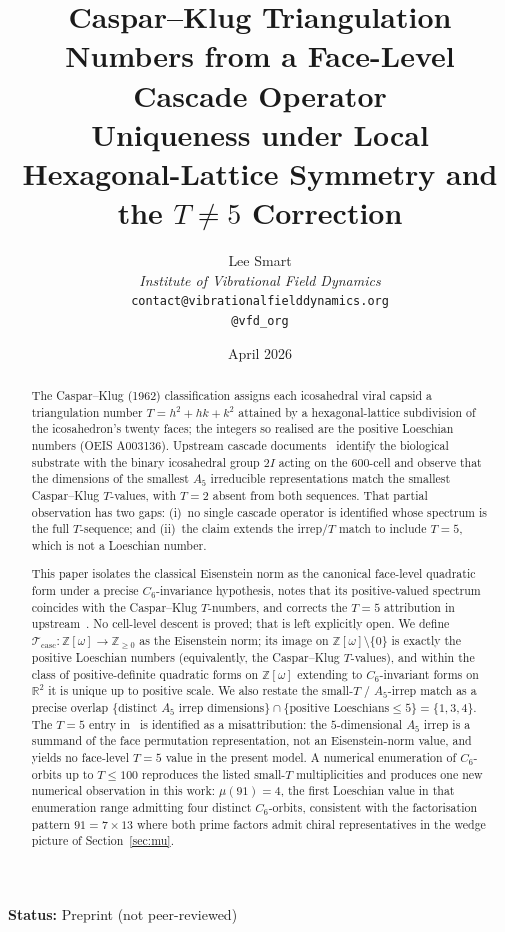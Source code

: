 \documentclass[12pt]{article}
\title{Caspar--Klug Triangulation Numbers from a Face-Level Cascade Operator\\[6pt]
\large Uniqueness under Local Hexagonal-Lattice Symmetry and the $T\neq5$ Correction}
\author{%
  Lee Smart\\[4pt]
  \textit{Institute of Vibrational Field Dynamics}\\[2pt]
  \texttt{contact@vibrationalfielddynamics.org}\\[2pt]
  \texttt{@vfd\_org}%
}
\date{April 2026}
\newcommand{\Tcasc}{\mathcal{T}_{\mathrm{casc}}}
\newcommand{\Zom}{\mathbb{Z}[\omega]}
\begin{document}
\maketitle

\noindent\textbf{Status:} Preprint (not peer-reviewed)

\begin{abstract}
The Caspar--Klug (1962) classification assigns each icosahedral viral
capsid a triangulation number $T = h^2 + hk + k^2$ attained by a
hexagonal-lattice subdivision of the icosahedron's twenty faces; the
integers so realised are the positive Loeschian numbers (OEIS
A003136).
Upstream cascade documents~\cite{CascadeBio} identify the biological
substrate with the binary icosahedral group $2I$ acting on the 600-cell
and observe that the dimensions of the smallest $A_5$ irreducible
representations match the smallest Caspar--Klug $T$-values, with
$T = 2$ absent from both sequences. That partial observation has two
gaps: (i)~no single cascade operator is identified whose spectrum is
the full $T$-sequence; and (ii)~the claim extends the irrep/$T$ match
to include $T = 5$, which is not a Loeschian number.

This paper isolates the classical Eisenstein norm as the canonical
face-level quadratic form under a precise $C_6$-invariance
hypothesis, notes that its positive-valued spectrum coincides with
the Caspar--Klug $T$-numbers, and corrects the $T = 5$ attribution
in upstream~\cite{CascadeBio}. No cell-level descent is proved; that
is left explicitly open. We define $\Tcasc : \Zom \to
\mathbb{Z}_{\ge 0}$ as the Eisenstein norm; its image on
$\Zom\setminus\{0\}$ is exactly the positive Loeschian numbers
(equivalently, the Caspar--Klug $T$-values), and within the class
of positive-definite quadratic forms on $\Zom$ extending to
$C_6$-invariant forms on $\mathbb{R}^2$ it is unique up to positive
scale. We also restate the small-$T$ / $A_5$-irrep
match as a precise overlap
$\{\text{distinct }A_5\text{ irrep dimensions}\}\cap
\{\text{positive Loeschians}\le 5\} = \{1, 3, 4\}$. The $T = 5$
entry in~\cite{CascadeBio} is identified as a misattribution: the
$5$-dimensional $A_5$ irrep is a summand of the face permutation
representation, not an Eisenstein-norm value, and yields no
face-level $T = 5$ value in the present model. A numerical enumeration of $C_6$-orbits up to $T \le 100$ reproduces
the listed small-$T$ multiplicities and produces one new numerical
observation in this work: $\mu(91) = 4$, the first Loeschian value
in that enumeration range admitting four distinct $C_6$-orbits,
consistent with the factorisation pattern $91 = 7 \times 13$ where
both prime factors admit chiral representatives in the wedge
picture of Section~\ref{sec:mu}.


\end{abstract}
\end{document}
